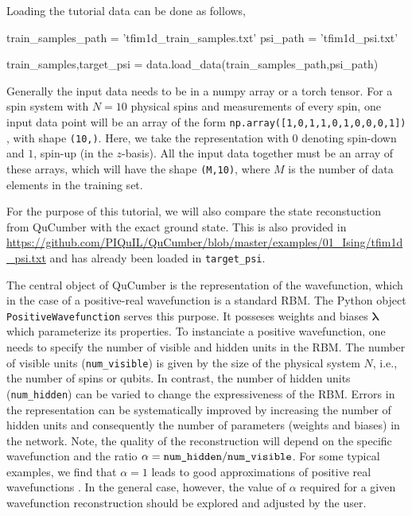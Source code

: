 \documentclass[submission, Phys]{SciPost}
\begin{document}
Loading the tutorial data can be done as follows,

\begin{python}
train_samples_path = 'tfim1d_train_samples.txt'
psi_path           = 'tfim1d_psi.txt'

train_samples,target_psi = data.load_data(train_samples_path,psi_path)
\end{python}

Generally the input data needs to be in a numpy array or a torch tensor.
For a spin system with $N=10$ physical spins and measurements of every spin, one input data point will be an array of the form
\verb|np.array([1,0,1,1,0,1,0,0,0,1])|
, with shape \verb|(10,)|.
Here, we take the representation with $0$ denoting spin-down and $1$, spin-up (in the $z$-basis).
All the input data together must be an array of these arrays, which will have the shape \verb|(M,10)|, where $M$ is the number of data elements in the training set.

For the purpose of this tutorial, we will also compare the state reconstuction from QuCumber with the exact ground state.
This is also provided in \url{https://github.com/PIQuIL/QuCumber/blob/master/examples/01_Ising/tfim1d_psi.txt} and has already been loaded in \verb|target_psi|.

The central object of QuCumber is the representation of the wavefunction, which in the case of a positive-real wavefunction
is a standard RBM.
The Python object \verb|PositiveWavefunction| serves this purpose.
It posseses weights and biases ${\bm \lambda}$ which parameterize its properties.
To instanciate a positive wavefunction, one needs to specify the number of visible and hidden units in the RBM.
The number of visible units (\verb|num_visible|) is given by the size of the physical system $N$, i.e., the number of spins or qubits.
In contrast, the number of hidden units (\verb|num_hidden|) can be varied to change the expressiveness of the RBM.
Errors in the representation can be systematically improved by increasing the number of hidden units and consequently
the number of parameters (weights and biases) in the network.
Note, the quality of the reconstruction will depend on the specific wavefunction and the ratio $\alpha = \verb|num_hidden|/\verb|num_visible|$.
For some typical examples, we find that $\alpha = 1$ leads to good approximations of positive real wavefunctions \cite{Torlai2016thermo}.
In the general case, however, the value of $\alpha$ required for a given wavefunction reconstruction should be explored and adjusted by the user.
\end{document}
